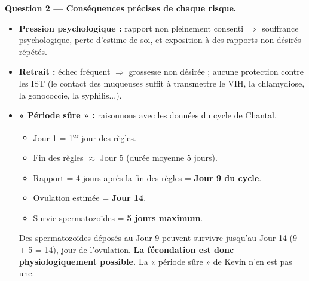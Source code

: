\documentclass[11pt]{article}
\begin{document}
\begin{exoresolu}
\textbf{Question 2 — Conséquences précises de chaque risque.}

\begin{itemize}
\item \textbf{Pression psychologique :} rapport non pleinement consenti $\Rightarrow$ souffrance psychologique, perte d'estime de soi, et exposition à des rapports non désirés répétés.
\item \textbf{Retrait :} échec fréquent $\Rightarrow$ grossesse non désirée ; aucune protection contre les IST (le contact des muqueuses suffit à transmettre le VIH, la chlamydiose, la gonococcie, la syphilis...).
\item \textbf{« Période sûre » :} raisonnons avec les données du cycle de Chantal.
  \begin{itemize}
  \item Jour 1 = 1\textsuperscript{er} jour des règles.
  \item Fin des règles $\approx$ Jour 5 (durée moyenne 5 jours).
  \item Rapport = 4 jours après la fin des règles = \textbf{Jour 9 du cycle}.
  \item Ovulation estimée = \textbf{Jour 14}.
  \item Survie spermatozoïdes = \textbf{5 jours maximum}.
  \end{itemize}
  Des spermatozoïdes déposés au Jour 9 peuvent survivre jusqu'au Jour 14 (9 + 5 = 14), jour de l'ovulation. \textbf{La fécondation est donc physiologiquement possible.} La « période sûre » de Kevin n'en est pas une.
  
  \begin{popfigure}
\end{popfigure}
\end{itemize}
\end{exoresolu}
\end{document}
